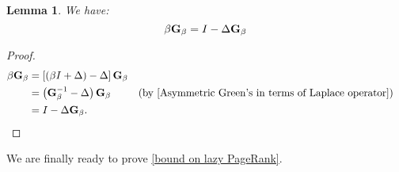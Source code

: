 \documentclass[12pt]{article}
\newtheorem{lem}[thm]{Lemma}
\theoremstyle{definition}
\newcommand{\laplace}{\Delta}
\newcommand{\asymgreen}{\normalfont{\textbf{G}}}
\begin{document}
\begin{lem}
We have:
$$
\beta \asymgreen_\beta = I - \laplace \asymgreen_\beta
$$
\end{lem}
\begin{proof}
\begin{align*}
\beta \asymgreen_\beta &=
\left[ (\beta I + \laplace) - \laplace \right] \asymgreen_\beta \\
&= \left( \asymgreen_\beta^{-1} - \laplace \right) \asymgreen_\beta &&\text{(by \cref{Asymmetric Green's in terms of Laplace operator})} \\
&= I - \laplace \asymgreen_\beta.
\end{align*}
\end{proof}

We are finally ready to prove \cref{bound on lazy PageRank}.
\end{document}
